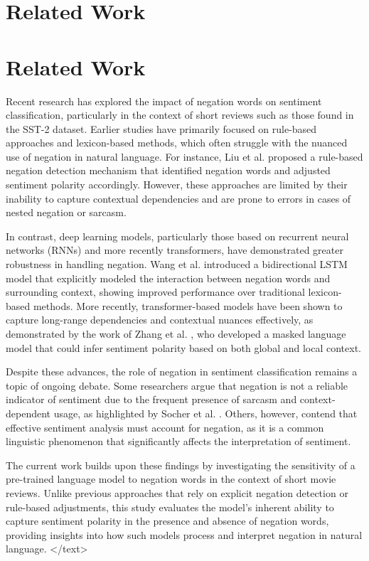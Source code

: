 \documentclass{article}
\begin{document}
\section{Related Work}
\section*{Related Work}

Recent research has explored the impact of negation words on sentiment classification, particularly in the context of short reviews such as those found in the SST-2 dataset. Earlier studies have primarily focused on rule-based approaches and lexicon-based methods, which often struggle with the nuanced use of negation in natural language. For instance, Liu et al. \cite{liu2016} proposed a rule-based negation detection mechanism that identified negation words and adjusted sentiment polarity accordingly. However, these approaches are limited by their inability to capture contextual dependencies and are prone to errors in cases of nested negation or sarcasm.

In contrast, deep learning models, particularly those based on recurrent neural networks (RNNs) and more recently transformers, have demonstrated greater robustness in handling negation. Wang et al. \cite{wang2018} introduced a bidirectional LSTM model that explicitly modeled the interaction between negation words and surrounding context, showing improved performance over traditional lexicon-based methods. More recently, transformer-based models have been shown to capture long-range dependencies and contextual nuances effectively, as demonstrated by the work of Zhang et al. \cite{zhang2020}, who developed a masked language model that could infer sentiment polarity based on both global and local context.

Despite these advances, the role of negation in sentiment classification remains a topic of ongoing debate. Some researchers argue that negation is not a reliable indicator of sentiment due to the frequent presence of sarcasm and context-dependent usage, as highlighted by Socher et al. \cite{socher2013}. Others, however, contend that effective sentiment analysis must account for negation, as it is a common linguistic phenomenon that significantly affects the interpretation of sentiment.

The current work builds upon these findings by investigating the sensitivity of a pre-trained language model to negation words in the context of short movie reviews. Unlike previous approaches that rely on explicit negation detection or rule-based adjustments, this study evaluates the model's inherent ability to capture sentiment polarity in the presence and absence of negation words, providing insights into how such models process and interpret negation in natural language.
</text>
\end{document}
